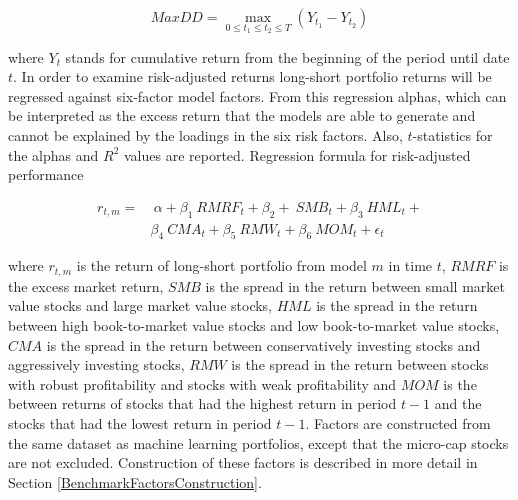 \documentclass[12pt]{article}
\begin{document}
\begin{equation}
\label{eq:maxDD}
MaxDD = \max\limits_{0\leq t_1\leq t_2\leq T} (Y_{t_1} - Y_{t_2})
\end{equation}

where $Y_t$ stands for cumulative return from the beginning of the period until date $t$. In order to examine risk-adjusted returns long-short portfolio returns will be regressed against \citet{FAMA20151} six-factor model factors\footnotemark. From this regression alphas, which can be interpreted as the excess return that the models are able to generate and cannot be explained by the loadings in the six risk factors. Also, $t$-statistics for the alphas and $R^2$ values are reported. Regression formula for risk-adjusted performance \par

\begin{equation}
\label{eq:FFRegFormula}
\begin{split}
r_{t, m} = 	& \ \alpha+ \beta_{1} \ RMRF_{t} + \beta_{2} + \ SMB_{t} + \beta_{3} \ HML_{t} + \\
		&  \beta_{4} \ CMA_{t} +  \beta_{5} \ RMW_{t} + \beta_{6} \ MOM_{t} + \epsilon_{t}
\end{split}
\end{equation}

where $r_{t, m}$ is the return of long-short portfolio from model $m$ in time $t$, $RMRF$ is the excess market return, $SMB$ is the spread in the return between small market value stocks and large market value stocks, $HML$ is the spread in the return between high book-to-market value stocks and low book-to-market value stocks, $CMA$ is the spread in the return between conservatively investing stocks and aggressively investing stocks, $RMW$ is the spread in the return between stocks with robust profitability and stocks with weak profitability and $MOM$ is the between returns of stocks that had the highest return in period $t-1$ and the stocks that had the lowest return in period $t-1$. Factors are constructed from the same dataset as machine learning portfolios, except that the micro-cap stocks are not excluded. Construction of these factors is described in more detail in Section \ref{BenchmarkFactorsConstruction}. \par

\end{document}
